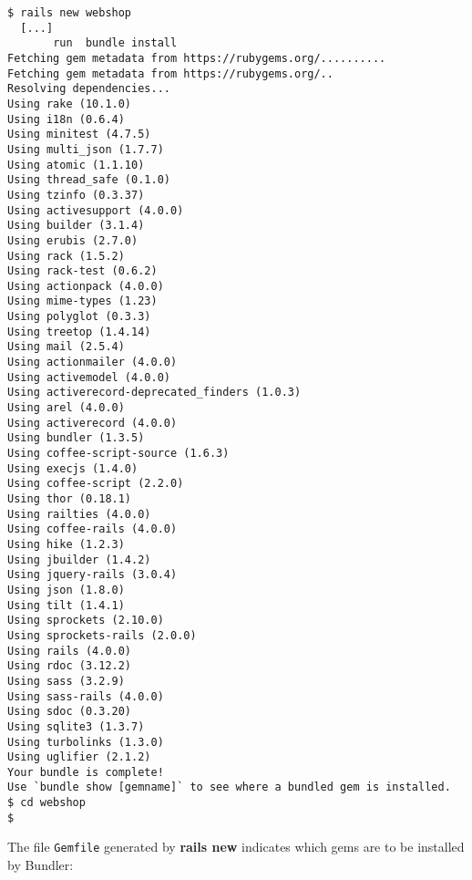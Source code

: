 \documentclass[a4paper]{book}
\begin{document}
\begin{shaded}\begin{verbatim}
$ rails new webshop
  [...]
       run  bundle install
Fetching gem metadata from https://rubygems.org/..........
Fetching gem metadata from https://rubygems.org/..
Resolving dependencies...
Using rake (10.1.0)
Using i18n (0.6.4)
Using minitest (4.7.5)
Using multi_json (1.7.7)
Using atomic (1.1.10)
Using thread_safe (0.1.0)
Using tzinfo (0.3.37)
Using activesupport (4.0.0)
Using builder (3.1.4)
Using erubis (2.7.0)
Using rack (1.5.2)
Using rack-test (0.6.2)
Using actionpack (4.0.0)
Using mime-types (1.23)
Using polyglot (0.3.3)
Using treetop (1.4.14)
Using mail (2.5.4)
Using actionmailer (4.0.0)
Using activemodel (4.0.0)
Using activerecord-deprecated_finders (1.0.3)
Using arel (4.0.0)
Using activerecord (4.0.0)
Using bundler (1.3.5)
Using coffee-script-source (1.6.3)
Using execjs (1.4.0)
Using coffee-script (2.2.0)
Using thor (0.18.1)
Using railties (4.0.0)
Using coffee-rails (4.0.0)
Using hike (1.2.3)
Using jbuilder (1.4.2)
Using jquery-rails (3.0.4)
Using json (1.8.0)
Using tilt (1.4.1)
Using sprockets (2.10.0)
Using sprockets-rails (2.0.0)
Using rails (4.0.0)
Using rdoc (3.12.2)
Using sass (3.2.9)
Using sass-rails (4.0.0)
Using sdoc (0.3.20)
Using sqlite3 (1.3.7)
Using turbolinks (1.3.0)
Using uglifier (2.1.2)
Your bundle is complete!
Use `bundle show [gemname]` to see where a bundled gem is installed.
$ cd webshop
$
\end{verbatim}\end{shaded}

The file \texttt{Gemfile} generated by \textbf{rails new} indicates which gems are to be installed by Bundler:
\end{document}
